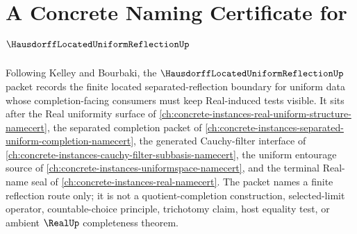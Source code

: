 \chapter{A Concrete Naming Certificate for $\HausdorffLocatedUniformReflectionUp$}
\label{ch:concrete-instances-hausdorff-located-uniform-reflection-namecert}

Following Kelley and Bourbaki, the $\HausdorffLocatedUniformReflectionUp$ packet records the finite located separated-reflection boundary for uniform data whose completion-facing consumers must keep Real-induced tests visible. It sits after the Real uniformity surface of \autoref{ch:concrete-instances-real-uniform-structure-namecert}, the separated completion packet of \autoref{ch:concrete-instances-separated-uniform-completion-namecert}, the generated Cauchy-filter interface of \autoref{ch:concrete-instances-cauchy-filter-subbasis-namecert}, the uniform entourage source of \autoref{ch:concrete-instances-uniformspace-namecert}, and the terminal Real-name seal of \autoref{ch:concrete-instances-real-namecert}. The packet names a finite reflection route only; it is not a quotient-completion construction, selected-limit operator, countable-choice principle, trichotomy claim, host equality test, or ambient $\RealUp$ completeness theorem.

